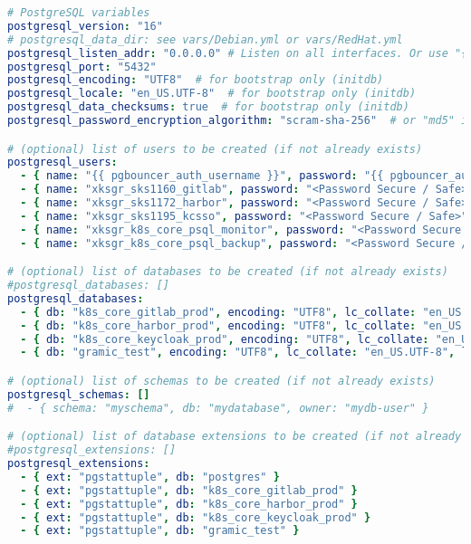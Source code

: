 \begin{flushleft}
\begin{lstlisting}[language=yaml, caption=Testsystem - Deployment - main.yml,captionpos=b,label={lst:testsystem-deployment-main.yml},breaklines=true]
# PostgreSQL variables
postgresql_version: "16"
# postgresql_data_dir: see vars/Debian.yml or vars/RedHat.yml
postgresql_listen_addr: "0.0.0.0" # Listen on all interfaces. Or use "{{ inventory_hostname }},127.0.0.1" to listen on a specific IP address.
postgresql_port: "5432"
postgresql_encoding: "UTF8"  # for bootstrap only (initdb)
postgresql_locale: "en_US.UTF-8"  # for bootstrap only (initdb)
postgresql_data_checksums: true  # for bootstrap only (initdb)
postgresql_password_encryption_algorithm: "scram-sha-256"  # or "md5" if your clients do not work with passwords encrypted with SCRAM-SHA-256

# (optional) list of users to be created (if not already exists)
postgresql_users:
  - { name: "{{ pgbouncer_auth_username }}", password: "{{ pgbouncer_auth_password }}", flags: "LOGIN", role: "" }
  - { name: "xksgr_sks1160_gitlab", password: "<Password Secure / Safe>", flags: "SUPERUSER" }
  - { name: "xksgr_sks1172_harbor", password: "<Password Secure / Safe>", flags: "SUPERUSER" }
  - { name: "xksgr_sks1195_kcsso", password: "<Password Secure / Safe>", flags: "SUPERUSER" }
  - { name: "xksgr_k8s_core_psql_monitor", password: "<Password Secure / Safe>", flags: "LOGIN", role: "pg_monitor" }
  - { name: "xksgr_k8s_core_psql_backup", password: "<Password Secure / Safe>", flags: "SUPERUSER" }

# (optional) list of databases to be created (if not already exists)
#postgresql_databases: []
postgresql_databases:
  - { db: "k8s_core_gitlab_prod", encoding: "UTF8", lc_collate: "en_US.UTF-8", lc_ctype: "en_US.UTF-8", owner: "xksgr_sks1160_gitlab" }
  - { db: "k8s_core_harbor_prod", encoding: "UTF8", lc_collate: "en_US.UTF-8", lc_ctype: "en_US.UTF-8", owner: "xksgr_sks1172_harbor" }
  - { db: "k8s_core_keycloak_prod", encoding: "UTF8", lc_collate: "en_US.UTF-8", lc_ctype: "en_US.UTF-8", owner: "xksgr_sks1195_kcsso" }
  - { db: "gramic_test", encoding: "UTF8", lc_collate: "en_US.UTF-8", lc_ctype: "en_US.UTF-8", owner: "postgres" }

# (optional) list of schemas to be created (if not already exists)
postgresql_schemas: []
#  - { schema: "myschema", db: "mydatabase", owner: "mydb-user" }

# (optional) list of database extensions to be created (if not already exists)
#postgresql_extensions: []
postgresql_extensions:
  - { ext: "pgstattuple", db: "postgres" }
  - { ext: "pgstattuple", db: "k8s_core_gitlab_prod" }
  - { ext: "pgstattuple", db: "k8s_core_harbor_prod" }
  - { ext: "pgstattuple", db: "k8s_core_keycloak_prod" }
  - { ext: "pgstattuple", db: "gramic_test" }


\end{lstlisting}
\end{flushleft}
